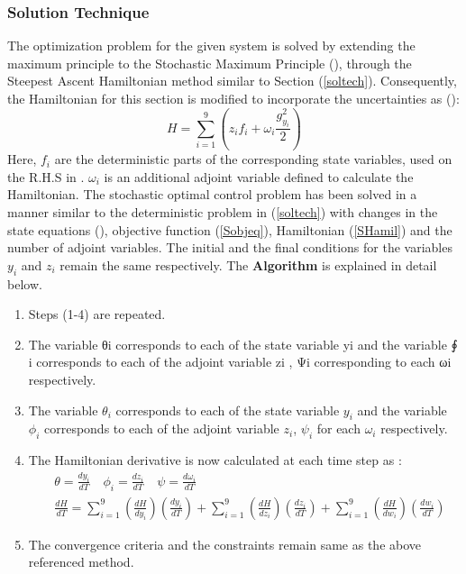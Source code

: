 \documentclass[3p,times,authoryear]{elsarticle}
\begin{document}
\subsubsection{Solution Technique}
The optimization problem for the given system is solved by extending the maximum principle to the Stochastic Maximum Principle (\cite{ramirez}), through the Steepest Ascent Hamiltonian method similar to Section (\ref{soltech}). Consequently, the Hamiltonian for this section is modified to incorporate the uncertainties as (\cite{yenkie}):
\begin{equation}
H = \sum_{i=1}^{9} \left( z_{i}f_{i} + \omega_{i}\frac{g_{y_{i}}^2}{2} \right) \label{SHamil}
\end{equation}
Here, $f_{i}$ are the deterministic parts of the corresponding state variables, used on the R.H.S in . $\omega_{i}$ is an additional adjoint variable defined to calculate the Hamiltonian.
The stochastic optimal control problem has been solved in a manner similar to the deterministic problem in \Section (\ref{soltech}) with changes in the state equations (), objective function (\ref{Sobjeq}), Hamiltonian (\ref{SHamil}) and the number of adjoint variables. The initial and the final conditions for the variables $y_{i}$ and $z_{i}$ remain the same respectively. The \textbf{Algorithm} is explained in detail below. 

\begin{enumerate}
\item  Steps (1-4) are repeated. 
\item The variable θi corresponds to each of the state variable yi and the variable ∮ i corresponds to each of the adjoint variable zi , Ψi corresponding to each ωi respectively.
\item The variable $\theta_{i}$ corresponds to each of the state variable $y_{i}$ and the variable $\phi_{i}$ corresponds to each of the adjoint variable $z_{i}$, $\psi_{i}$ for each $\omega_{i}$ respectively.

\item The Hamiltonian derivative is now calculated at each time step  as :
\begin{align}
&\theta = \frac{dy_{i}}{dT} \quad \phi_{i} = \frac{dz_{i}}{dT} \quad \psi = \frac{d\omega_{i}}{dT} \\
&\frac{dH}{dT} = \sum_{i=1}^{9} \left( \frac{dH}{dy_{i}}\right)\left(	\frac{dy_{i}}{dT} \right) + \sum_{i=1}^{9} \left(\frac{dH}{dz_{i}}\right)\left(\frac{dz_{i}}{dT} \right) + \sum_{i=1}^{9} \left(\frac{dH}{dw_{i}}\right)\left(\frac{dw_{i}}{dT} \right)
\end{align}
\item The convergence criteria and the constraints remain same as the above referenced method.
\end{enumerate} 
\end{document}
